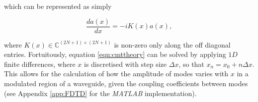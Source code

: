 which can be represented as simply

\begin{equation}
\dfrac{d a(x)}{dx} = - i K(x) a(x),
\label{eqn:cmttheory}
\end{equation}

where $K(x) \in \mathbb{C}^{(2N+1) \times (2N+1)}$ is non-zero only along the off diagonal entries. Fortuitously, equation \ref{eqn:cmttheory} can be solved by applying $1D$ finite differences, where $x$ is discretised with step size $\Delta x$, so that $x_n = x_0 + n \Delta x$. This allows for the calculation of how the amplitude of modes varies with $x$ in a modulated region of a waveguide, given the coupling coefficients between modes (see Appendix \ref{app:FDTD} for the \textit{MATLAB} implementation).